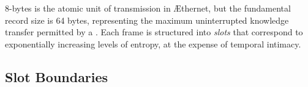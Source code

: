 \documentclass[../OAE-SPEC-MAIN.tex]{subfiles}
\begin{document}
8-bytes is the atomic unit of transmission in \AE thernet, but the fundamental record size is 64 bytes, representing the maximum uninterrupted knowledge transfer permitted by a \LINK. Each frame is structured into \emph{slots} that correspond to exponentially increasing levels of entropy, at the expense of temporal intimacy.




\subsection{Slot Boundaries}
\end{document}
